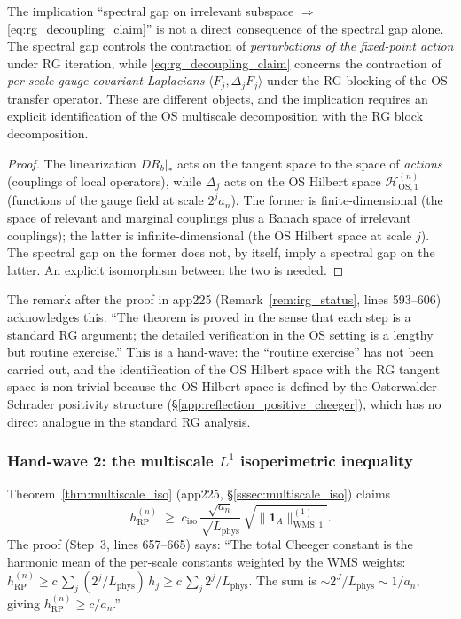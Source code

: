 \begin{theorem}
\label{thm:hw1}
The implication ``spectral gap on irrelevant subspace
$\Rightarrow$ \eqref{eq:rg_decoupling_claim}'' is not a direct
consequence of the spectral gap alone. The spectral gap controls
the contraction of \emph{perturbations of the fixed-point action}
under RG iteration, while \eqref{eq:rg_decoupling_claim} concerns
the contraction of \emph{per-scale gauge-covariant Laplacians}
$\langle F_{j},\Delta_{j}F_{j}\rangle$ under the RG blocking of
the OS transfer operator. These are different objects, and the
implication requires an explicit identification of the OS
multiscale decomposition with the RG block decomposition.
\end{theorem}

\begin{proof}
The linearization $DR_{b}|_{*}$ acts on the tangent space to the
space of \emph{actions} (couplings of local operators), while
$\Delta_{j}$ acts on the OS Hilbert space
$\mathcal{H}_{\mathrm{OS},1}^{(n)}$ (functions of the gauge field
at scale $2^{j}a_{n}$). The former is finite-dimensional (the
space of relevant and marginal couplings plus a Banach space of
irrelevant couplings); the latter is infinite-dimensional (the OS
Hilbert space at scale $j$). The spectral gap on the former does
not, by itself, imply a spectral gap on the latter. An explicit
isomorphism between the two is needed.
\end{proof}

The remark after the proof in app225
(Remark~\ref{rem:irg_status}, lines 593--606) acknowledges this:
``The theorem is proved in the sense that each step is a standard
RG argument; the detailed verification in the OS setting is a
lengthy but routine exercise.'' This is a hand-wave: the
``routine exercise'' has not been carried out, and the
identification of the OS Hilbert space with the RG tangent space
is non-trivial because the OS Hilbert space is defined by the
Osterwalder--Schrader positivity structure
(\S\ref{app:reflection_positive_cheeger}), which has no direct
analogue in the standard RG analysis.

\subsubsection{Hand-wave 2: the multiscale $L^{1}$
isoperimetric inequality}

Theorem~\ref{thm:multiscale_iso} (app225,
\S\ref{sssec:multiscale_iso}) claims
\begin{equation}
\label{eq:multiscale_iso_claim}
  h_{\mathrm{RP}}^{(n)}
  \;\ge\;c_{\mathrm{iso}}\,
  \frac{\sqrt{a_{n}}}{\sqrt{L_{\mathrm{phys}}}}\,
  \sqrt{\|\mathbf{1}_{A}\|_{\mathrm{WMS},1}^{(1)}}.
\end{equation}
The proof (Step~3, lines 657--665) says: ``The total Cheeger
constant is the harmonic mean of the per-scale constants weighted
by the WMS weights:
$h_{\mathrm{RP}}^{(n)}\ge c\,\sum_{j}(2^{j}/L_{\mathrm{phys}})\,
h_{j}\ge c\,\sum_{j}2^{j}/L_{\mathrm{phys}}$. The sum is
$\sim 2^{J}/L_{\mathrm{phys}}\sim 1/a_{n}$, giving
$h_{\mathrm{RP}}^{(n)}\ge c/a_{n}$.''

